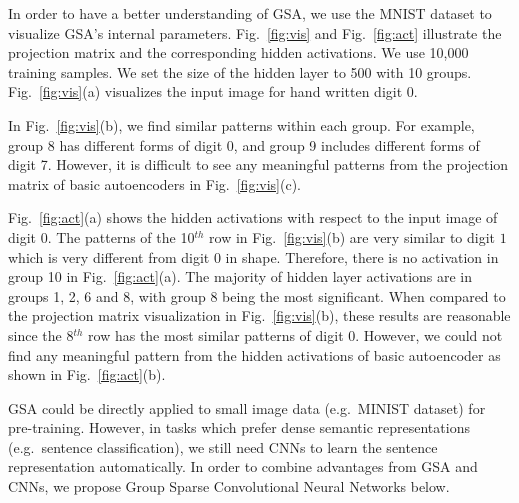 In order to have a better understanding of GSA, %
we use the MNIST dataset to visualize GSA's internal parameters. %
Fig.~\ref{fig:vis} and Fig.~\ref{fig:act} illustrate the projection matrix and the corresponding hidden activations.
We use 10,000 training samples. We set the size of the hidden layer to 500 with 10 groups. Fig.~\ref{fig:vis}(a) visualizes the input image for hand written digit $0$.%


In Fig.~\ref{fig:vis}(b), we find similar patterns within each group. For example, group 8 has different forms of digit 0, 
and group 9 includes different forms of digit 7. However, it is difficult to see any meaningful patterns from the projection matrix of basic autoencoders in Fig.~\ref{fig:vis}(c). 

Fig.~\ref{fig:act}(a) shows the hidden activations with respect to the input image of digit 0. 
The patterns of the 10$^{th}$ row in Fig.~\ref{fig:vis}(b) are very similar to digit $1$ which is very different from digit $0$ in shape. Therefore, there is no activation in group 10 in Fig.~\ref{fig:act}(a).
The majority of hidden layer activations are in groups 1, 2, 6 and 8,
with group 8 being the most significant. %
When compared to the projection matrix visualization in Fig.~\ref{fig:vis}(b), these results are reasonable since the 8$^{th}$ row has the most similar patterns of digit 0.
However, we could not find any meaningful pattern from the hidden activations of basic autoencoder as shown in Fig.~\ref{fig:act}(b).


GSA could be directly applied to small image data (e.g.~MINIST dataset) for pre-training. 
However, in tasks which prefer dense semantic representations (e.g.~sentence classification), we still need CNNs to learn the sentence representation automatically. 
In order to combine advantages from GSA and CNNs, we propose Group Sparse Convolutional Neural Networks below.%




